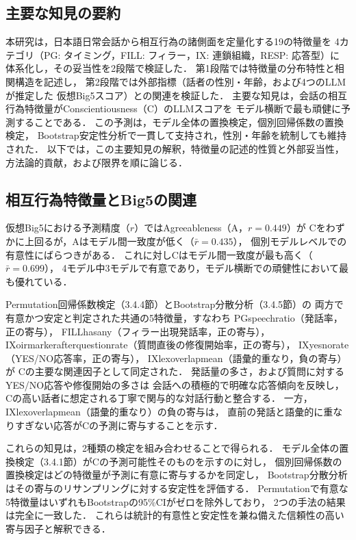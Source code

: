 \documentclass[dvipdfmx,11pt,a4paper]{bxjsarticle}
\renewcommand{\_}{\paperorigunderscore\allowbreak}%
\begin{document}
\subsection{主要な知見の要約}

本研究は，日本語日常会話から相互行為の諸側面を定量化する19の特徴量を
4カテゴリ（PG: タイミング，FILL: フィラー，IX: 連鎖組織，RESP: 応答型）に
体系化し，その妥当性を2段階で検証した．
第1段階では特徴量の分布特性と相関構造を記述し，
第2段階では外部指標（話者の性別・年齢，および4つのLLMが推定した
仮想Big5スコア）との関連を検証した．
主要な知見は，会話の相互行為特徴量がConscientiousness（C）のLLMスコアを
モデル横断で最も頑健に予測することである．
この予測は，モデル全体の置換検定，個別回帰係数の置換検定，
Bootstrap安定性分析で一貫して支持され，性別・年齢を統制しても維持された．
以下では，この主要知見の解釈，特徴量の記述的性質と外部妥当性，
方法論的貢献，および限界を順に論じる．

\subsection{相互行為特徴量とBig5の関連}

仮想Big5における予測精度（$r$）ではAgreeableness（A，$r = 0.449$）が
Cをわずかに上回るが，Aはモデル間一致度が低く（$\bar{r} = 0.435$），
個別モデルレベルでの有意性にばらつきがある．
これに対しCはモデル間一致度が最も高く（$\bar{r} = 0.699$），
4モデル中3モデルで有意であり，モデル横断での頑健性において最も優れている．

Permutation回帰係数検定（3.4.4節）とBootstrap分散分析（3.4.5節）の
両方で有意かつ安定と判定された共通の5特徴量，すなわち
PG\_speech\_ratio（発話率，正の寄与），
FILL\_has\_any（フィラー出現発話率，正の寄与），
IX\_oirmarker\_after\_question\_rate（質問直後の修復開始率，正の寄与），
IX\_yesno\_rate（YES/NO応答率，正の寄与），
IX\_lex\_overlap\_mean（語彙的重なり，負の寄与）が
Cの主要な関連因子として同定された．
発話量の多さ，および質問に対するYES/NO応答や修復開始の多さは
会話への積極的で明確な応答傾向を反映し，
Cの高い話者に想定される丁寧で関与的な対話行動と整合する．
一方，IX\_lex\_overlap\_mean（語彙的重なり）の負の寄与は，
直前の発話と語彙的に重なりすぎない応答がCの予測に寄与することを示す．

これらの知見は，2種類の検定を組み合わせることで得られる．
モデル全体の置換検定（3.4.1節）がCの予測可能性そのものを示すのに対し，
個別回帰係数の置換検定はどの特徴量が予測に有意に寄与するかを同定し，
Bootstrap分散分析はその寄与のリサンプリングに対する安定性を評価する．
Permutationで有意な5特徴量はいずれもBootstrapの95\%CIがゼロを除外しており，
2つの手法の結果は完全に一致した．
これらは統計的有意性と安定性を兼ね備えた信頼性の高い寄与因子と解釈できる．
\end{document}
